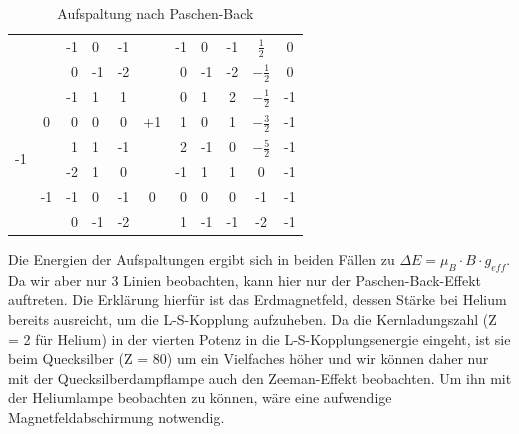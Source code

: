 \documentclass[bigchapter,colorback,accentcolor=tud4b,linedtoc,11pt]{tudreport}
\begin{document}
\begin{table}[H]
\begin{center}
\begin{tabular}{|c||c|r@{|}l|c||c|r@{|}l|c||c|c|}
                         &                     & -1    & 0     & -1              &                     & -1     & 0      & -1                & $\frac{1}{2}$  & 0           \\ 
                         &                     & 0     & -1    & -2              &                     & 0      & -1     & -2                & $-\frac{1}{2}$ & 0           \\ \hline
     \multirow{6}{*}{-1} & \multirow{3}{*}{0}  & -1    & 1     & 1               & \multirow{3}{*}{+1} & 0      & 1      & 2                 & $-\frac{1}{2}$ & -1          \\ 
                         &                     & 0     & 0     & 0               &                     & 1      & 0      & 1                 & $-\frac{3}{2}$ & -1          \\ 
                         &                     & 1     & 1     & -1              &                     & 2      & -1     & 0                 & $-\frac{5}{2}$ & -1          \\ \cline{2-11}
                         & \multirow{3}{*}{-1} & -2    & 1     & 0               & \multirow{3}{*}{0}  & -1     & 1      & 1                 & 0              & -1          \\ 
                         &                     & -1    & 0     & -1              &                     & 0      & 0      & 0                 & -1             & -1          \\ 
                         &                     & 0     & -1    & -2              &                     & 1      & -1     & -1                & -2             & -1          \\ \hline
    \end{tabular}
    \caption{Aufspaltung nach Paschen-Back}
  \end{center}
\end{table}

Die Energien der Aufspaltungen ergibt sich in beiden Fällen zu $\Delta E = \mu _B \cdot B \cdot g_{eff}$. Da wir aber nur 3 Linien beobachten, kann hier nur der Paschen-Back-Effekt auftreten. Die Erklärung hierfür ist das Erdmagnetfeld, dessen Stärke bei Helium bereits ausreicht, um die L-S-Kopplung aufzuheben. Da die Kernladungszahl (Z = 2 für Helium) in der vierten Potenz in die L-S-Kopplungsenergie eingeht, ist sie beim Quecksilber (Z = 80) um ein Vielfaches höher und wir können daher nur mit der Quecksilberdampflampe auch den Zeeman-Effekt beobachten. Um ihn mit der Heliumlampe beobachten zu können, wäre eine aufwendige Magnetfeldabschirmung notwendig.
\end{document}
